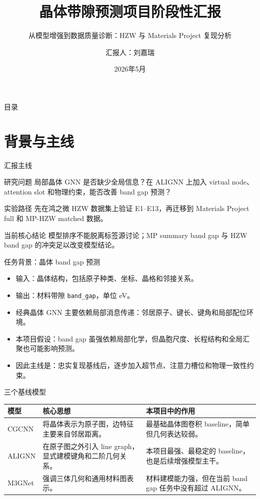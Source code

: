 \documentclass[aspectratio=169]{beamer}
\title[晶体带隙预测阶段性汇报]{晶体带隙预测项目阶段性汇报}
\subtitle{从模型增强到数据质量诊断：HZW 与 Materials Project 复现分析}
\author[刘嘉瑞]{汇报人：刘嘉瑞}
\institute[GNN Band Gap]{任务：晶体 band gap 回归预测\\模型：CGCNN / ALIGNN / M3GNet / Virtual Node / Attentive Dual Slot}
\date{2026年5月}
\begin{document}
\begin{frame}
 \titlepage
\end{frame}

\begin{frame}{目录}
 \tableofcontents
\end{frame}

\section{背景与主线}

\begin{frame}{汇报主线}
\small
\begin{block}{研究问题}
局部晶体 GNN 是否缺少全局信息？在 ALIGNN 上加入 virtual node、attention slot 和物理约束，能否改善 band gap 预测？
\end{block}

\begin{block}{实验路径}
先在鸿之微 HZW 数据集上验证 E1--E13，再迁移到 Materials Project full 和 MP-HZW matched 数据。
\end{block}

\begin{alertblock}{当前核心结论}
模型排序不能脱离标签源讨论；MP summary band gap 与 HZW band gap 的冲突足以改变模型结论。
\end{alertblock}
\end{frame}

\begin{frame}{任务背景：晶体 band gap 预测}
\small
\begin{itemize}
  \item 输入：晶体结构，包括原子种类、坐标、晶格和邻接关系。
  \item 输出：材料带隙 \texttt{band\_gap}，单位 eV。
  \item 经典晶体 GNN 主要依赖局部消息传递：邻居原子、键长、键角和局部配位环境。
  \item 本项目假设：band gap 虽强依赖局部化学，但晶胞尺度、长程结构和全局汇聚也可能影响预测。
  \item 因此主线是：忠实复现基线后，逐步加入超节点、注意力槽位和物理一致性约束。
\end{itemize}
\end{frame}

\begin{frame}{三个基线模型}
\scriptsize
\centering
\setlength{\tabcolsep}{4pt}
\begin{tabularx}{\textwidth}{p{2.1cm} Y Y}
\toprule
模型 & 核心思想 & 本项目中的作用 \\
\midrule
CGCNN & 将晶体表示为原子图，边特征主要来自邻居距离。 & 最基础晶体图卷积 baseline，简单但几何表达较弱。 \\
ALIGNN & 在原子图之外引入 line graph，显式建模键角和二阶几何关系。 & 本项目最强、最稳定的 baseline，也是后续增强模型主干。 \\
M3GNet & 强调三体几何和通用材料图表示。 & 材料建模能力强，但在当前 band gap 任务中没有超过 ALIGNN。 \\
\bottomrule
\end{tabularx}
\end{frame}
\end{document}
